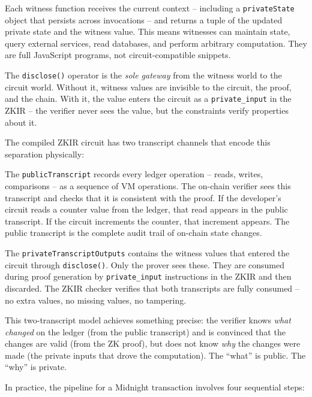 \documentclass[
  11pt,
  openany]{report}
\begin{document}
Each witness function receives the current context -- including a
\texttt{privateState} object that persists across invocations -- and returns a
tuple of the updated private state and the witness value. This means witnesses
can maintain state, query external services, read databases, and perform
arbitrary computation. They are full JavaScript programs, not circuit-compatible
snippets.

The \texttt{disclose()} operator is the \emph{sole gateway} from the witness
world to the circuit world. Without it, witness values are invisible to the
circuit, the proof, and the chain. With it, the value enters the circuit as a
\texttt{private\_input} in the ZKIR -- the verifier never sees the value, but
the constraints verify properties about it.

The compiled ZKIR circuit has two transcript channels that encode this
separation physically:

The \texttt{publicTranscript} records every ledger operation -- reads, writes,
comparisons -- as a sequence of VM operations. The on-chain verifier sees this
transcript and checks that it is consistent with the proof. If the developer's
circuit reads a counter value from the ledger, that read appears in the public
transcript. If the circuit increments the counter, that increment appears. The
public transcript is the complete audit trail of on-chain state changes.

The \texttt{privateTranscriptOutputs} contains the witness values that entered
the circuit through \texttt{disclose()}. Only the prover sees these. They are
consumed during proof generation by \texttt{private\_input} instructions in the
ZKIR and then discarded. The ZKIR checker verifies that both transcripts are
fully consumed -- no extra values, no missing values, no tampering.

This two-transcript model achieves something precise: the verifier knows
\emph{what changed} on the ledger (from the public transcript) and is convinced
that the changes are valid (from the ZK proof), but does not know \emph{why} the
changes were made (the private inputs that drove the computation). The ``what''
is public. The ``why'' is private.

In practice, the pipeline for a Midnight transaction involves four sequential
steps:
\end{document}

